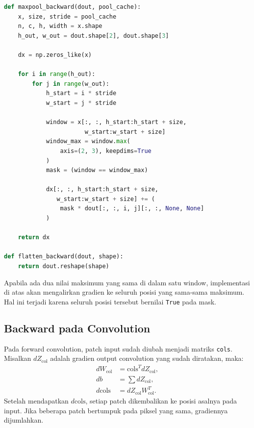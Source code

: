 \documentclass[12pt, letterpaper]{article}
\begin{document}
\begin{lstlisting}[language=Python, caption=Backward max pooling dan flatten]
def maxpool_backward(dout, pool_cache):
    x, size, stride = pool_cache
    n, c, h, width = x.shape
    h_out, w_out = dout.shape[2], dout.shape[3]

    dx = np.zeros_like(x)

    for i in range(h_out):
        for j in range(w_out):
            h_start = i * stride
            w_start = j * stride

            window = x[:, :, h_start:h_start + size,
                       w_start:w_start + size]
            window_max = window.max(
                axis=(2, 3), keepdims=True
            )
            mask = (window == window_max)

            dx[:, :, h_start:h_start + size,
               w_start:w_start + size] += (
                mask * dout[:, :, i, j][:, :, None, None]
            )

    return dx

def flatten_backward(dout, shape):
    return dout.reshape(shape)
\end{lstlisting}

Apabila ada dua nilai maksimum yang sama di dalam satu window, implementasi di atas akan mengalirkan gradien ke seluruh posisi yang sama-sama maksimum. Hal ini terjadi karena seluruh posisi tersebut bernilai \texttt{True} pada mask.

\subsection*{Backward pada Convolution}
Pada forward convolution, patch input sudah diubah menjadi matriks \texttt{cols}. Misalkan $dZ_{\text{col}}$ adalah gradien output convolution yang sudah diratakan, maka:
\begin{align}
  dW_{\text{col}} &= \text{cols}^{T}dZ_{\text{col}},\\
  db &= \sum dZ_{\text{col}},\\
  d\text{cols} &= dZ_{\text{col}}W_{\text{col}}^{T}.
\end{align}
Setelah mendapatkan $d\text{cols}$, setiap patch dikembalikan ke posisi asalnya pada input. Jika beberapa patch bertumpuk pada piksel yang sama, gradiennya dijumlahkan.
\end{document}
